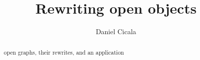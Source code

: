 \documentclass{amsart}
\begin{document}
\begin{abstract} %
	open graphs, 
	their rewrites, 
	and an application
\end{abstract}	

\title{Rewriting open objects}
\author{Daniel Cicala}
\maketitle


\end{document}
